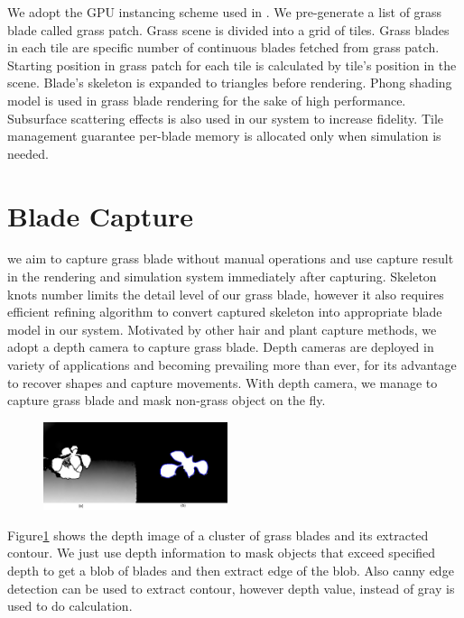 \documentclass[10pt,journal,compsoc]{IEEEtran}
\begin{document}
We adopt the GPU instancing scheme used in \cite{fan2015simulation}. We pre-generate a list of grass blade called grass patch. Grass scene is divided into a grid of tiles. Grass blades in each tile are specific number of continuous blades fetched from grass patch. Starting position in grass patch for each tile is calculated by tile's position in the scene. Blade's skeleton is expanded to triangles before rendering. Phong shading model is used in grass blade rendering for the sake of high performance. Subsurface scattering effects is also used in our system to increase fidelity\cite{sousa2007vegetation}. Tile management guarantee per-blade memory is allocated only when simulation is needed.  \\

\section{Blade Capture}\label{sec:capture}
we aim to capture grass blade without manual operations and use capture result in the rendering and simulation system immediately after capturing. Skeleton knots number limits the detail level of our grass blade, however it also requires efficient refining algorithm to convert captured skeleton into appropriate blade model in our system. Motivated by other hair and plant capture methods, we adopt a depth camera to capture grass blade. Depth cameras are deployed in variety of applications and becoming prevailing more than ever, for its advantage to recover shapes and capture movements. With depth camera, we manage to capture grass blade and mask non-grass object on the fly.\\

\begin{figure}
    \centering
    \includegraphics[width=0.48\textwidth]{figs/depth_contour.jpg}
    \label{fig:depthimage}
\end{figure}

Figure\ref{fig:depthimage} shows the depth image of a cluster of grass blades and its extracted contour. We just use depth information to mask objects that exceed specified depth to get a blob of blades and then extract edge of the blob. Also canny edge detection can be used to extract contour, however depth value, instead of gray is used to do calculation.
\end{document}
